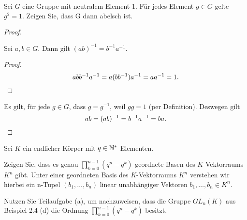 \begin{Problem}
	Sei $G$ eine Gruppe mit neutralem Element 1. Für jedes Element $g \in G$ gelte $g^2 = 1$. Zeigen Sie, dass G dann abelsch ist.
\end{Problem}

\begin{proof}
\begin{Lemma}
	Sei $a,b\in G$. Dann gilt $(ab)^{-1}=b^{-1}a^{-1}$.
\end{Lemma}
\begin{proof}
	\[abb^{-1}a^{-1}=a(bb^{-1})a^{-1}=aa^{-1}=1.\qedhere\]
\end{proof}
Es gilt, f\"{u}r jede $g\in G$, dass $g=g^{-1}$, weil $gg=1$ (per Definition). Deswegen gilt
\[
ab=(ab)^{-1}=b^{-1}a^{-1}=ba
.\qedhere\] 
\end{proof}

\begin{Problem}
	Sei $K$ ein endlicher Körper mit $q \in \mathbb{N}^*$ Elementen.
	\begin{parts}
		\item Zeigen Sie, dass es genau $\prod_{k=0}^{n-1} (q^n-q^k)$ geordnete Basen des $K$-Vektorraums $K^n$ gibt. Unter einer geordneten Basis des $K$-Vektorraums $K^n$ verstehen wir hierbei ein n-Tupel $(b_1 , \dots, b_n)$ linear unabhängiger Vektoren $b_1, \dots, b_n \in K^n$.
		\item Nutzen Sie Teilaufgabe (a), um nachzuweisen, dass die Gruppe $GL_n(K)$ aus Beispiel 2.4 (d) die Ordnung $\prod_{k=0}^{n-1} (q^n-q^k) $ besitzt.
	\end{parts}
\end{Problem}

